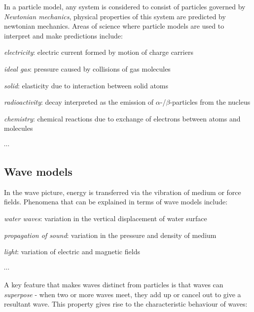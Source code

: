 \documentclass[a4paper,12pt]{book}
\begin{document}
In a particle model, any system is considered to consist of particles governed by \emph{Newtonian mechanics}, physical properties of this system are predicted by newtonian mechanics. Areas of science where particle models are used to interpret and make predictions include:

\begin{compactenum}
	\item[-] \emph{electricity}: electric current formed by motion of charge carriers
	
	\item[-] \emph{ideal gas}: pressure caused by collisions of gas molecules
	
	\item[-] \emph{solid}: elasticity due to interaction between solid atoms
	
	\item[-] \emph{radioactivity}: decay interpreted as the emission of $\alpha$-/$\beta$-particles from the nucleus
	
	\item[-] \emph{chemistry}: chemical reactions due to exchange of electrons between atoms and molecules
	
	\item[-] $\cdots$
\end{compactenum}

\subsection{Wave models}

In the wave picture, energy is transferred via the vibration of medium or force fields. Phenomena that can be explained in terms of wave models include:

\begin{compactenum}
	\item[-] \emph{water waves}: variation in the vertical displacement of water surface
	
	\item[-] \emph{propagation of sound}: variation in the pressure and density of medium
	
	\item[-] \emph{light}: variation of electric and magnetic fields
	
	\item[-] $\cdots$
\end{compactenum}

A key feature that makes waves distinct from particles is that waves can \emph{superpose} - when two or more waves meet, they add up or cancel out to give a resultant wave. This property gives rise to the characteristic behaviour of waves:
\end{document}
